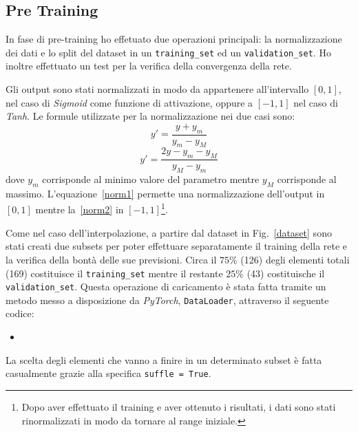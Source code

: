 \documentclass[12pt,a4paper,final]{book}
\newcommand{\insertcode}[2]{\begin{itemize}\item[]\end{itemize}} %
\begin{document}

\subsection{Pre Training}\label{pre_training}
In fase di pre-training ho effetuato due operazioni principali: la normalizzazione dei dati e lo split del dataset in un \texttt{training\_set} ed un \texttt{validation\_set}. Ho inoltre effettuato un test per la verifica della convergenza della rete.


Gli output sono stati normalizzati in modo da appartenere all'intervallo $[0, 1]$, nel caso di \textit{Sigmoid} come funzione di attivazione, oppure a $[-1, 1]$ nel caso di \textit{Tanh}. Le formule utilizzate per la normalizzazione nei due casi sono:
\begin{equation}\label{norm1}
y'=\frac{y+y_m}{y_m-y_M}
\end{equation}
\begin{equation}\label{norm2}
y'=\frac{2y-y_m-y_M}{y_M-y_m}
\end{equation}
dove $y_m$ corrisponde al minimo valore del parametro mentre $y_M$ corrisponde al massimo.
L'equazione~\ref{norm1} permette una normalizzazione dell'output in $[0, 1]$ mentre la~\ref{norm2} in $[-1, 1]$\footnote{Dopo aver effettuato il training e aver ottenuto i risultati, i dati sono stati rinormalizzati in modo da tornare al range iniziale.}.

Come nel caso dell'interpolazione, a partire dal dataset in Fig.~\ref{dataset} sono stati creati due subsets per poter effettuare separatamente il training della rete e la verifica della bontà delle sue previsioni. Circa il $75\%$ (126) degli elementi totali (169) costituisce il \texttt{training\_set} mentre il restante $25\%$ (43) costituische il \texttt{validation\_set}. Questa operazione di caricamento è stata fatta tramite un metodo messo a disposizione da \textit{PyTorch}, \texttt{DataLoader}, attraverso il seguente codice:
\insertcode{../scripts/loader.py}{Loader}\label{loader}
La scelta degli elementi che vanno a finire in un determinato subset è fatta casualmente grazie alla specifica \texttt{suffle = True}.
\end{document}

